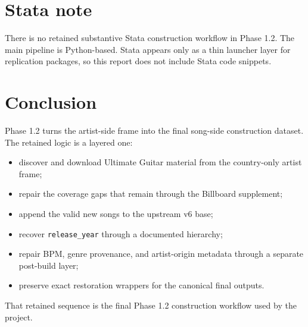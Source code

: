 \documentclass[11pt]{article}
\begin{document}
\section{Stata note}
There is no retained substantive Stata construction workflow in Phase 1.2. The
main pipeline is Python-based. Stata appears only as a thin launcher layer for
replication packages, so this report does not include Stata code snippets.

\section{Conclusion}
Phase 1.2 turns the artist-side frame into the final song-side construction
dataset. The retained logic is a layered one:
\begin{itemize}[leftmargin=2em]
\item discover and download Ultimate Guitar material from the country-only
artist frame;
\item repair the coverage gaps that remain through the Billboard supplement;
\item append the valid new songs to the upstream v6 base;
\item recover \texttt{release\_year} through a documented hierarchy;
\item repair BPM, genre provenance, and artist-origin metadata through a
separate post-build layer;
\item preserve exact restoration wrappers for the canonical final outputs.
\end{itemize}

That retained sequence is the final Phase 1.2 construction workflow used by the
project.
\end{document}
